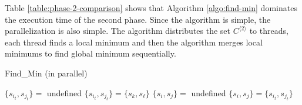 \documentclass[12pt]{article}
\begin{document}
\begin{table}[ht]
	\center
	\caption{Comparison of execution time of the Algorithm \ref{algo:find-min}($t_{FIND\_MIN}$) and the second phase ($t_{SECOND\_PHASE}$)}
	\label{table:phase-2-comparison}
\end{table}

Table \ref{table:phase-2-comparison} shows that Algorithm \ref{algo:find-min} dominates the execution time of the second phase. Since the algorithm is simple, the parallelization is also simple. The algorithm distributes the set $C^{\langle 2 \rangle}$ to threads, each thread finds a local minimum and then the algorithm merges local minimums to find global minimum sequentially.



\begin{algorithm}[ht]
	\caption{Find\_Min (in parallel)}
	\label{algo:find-min-parallel}
	
	{
	$\{ s_{i_t},s_{j_t} \} =$ undefined
	}
	{
		{
			$\{ s_{i_t},s_{j_t} \} = \{ s_k, s_\ell \}$
		}
	}
	$\{ s_i,s_j \} =$ undefined\;
	{
		{
			$\{ s_i,s_j \} = \{ s_{i_t},s_{j_t} \}$
		}
	}
\end{algorithm}
\end{document}
